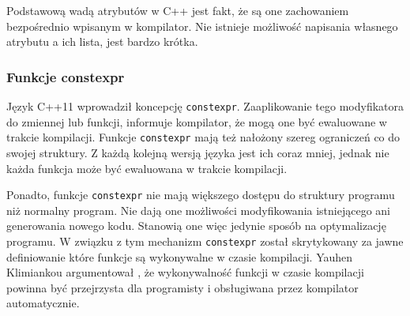 Podstawową wadą atrybutów w C++ jest fakt, że są one zachowaniem bezpośrednio wpisanym w kompilator. Nie istnieje możliwość napisania własnego atrybutu a ich lista, jest bardzo krótka.\par
\subsubsection{Funkcje constexpr}
Język C++11 wprowadził koncepcję \lstinline{constexpr}\cite{ISO:2012:III}.
Zaaplikowanie tego modyfikatora do zmiennej lub funkcji, informuje kompilator, że mogą one być ewaluowane w trakcie kompilacji. Funkcje \lstinline{constexpr} mają też nałożony szereg ograniczeń co do swojej struktury. Z każdą kolejną wersją języka jest ich coraz mniej, jednak nie każda funkcja może być ewaluowana w trakcie kompilacji.

Ponadto, funkcje \lstinline{constexpr} nie mają większego dostępu do struktury programu niż normalny program. Nie dają one możliwości modyfikowania istniejącego ani generowania nowego kodu. Stanowią one więc jedynie sposób na optymalizację programu.
W związku z tym mechanizm \lstinline{constexpr} został skrytykowany za jawne definiowanie które funkcje są wykonywalne w czasie kompilacji.
Yauhen Klimiankou argumentował \cite{Klimiankou:contexpr_great_good_wrong_idea}, że wykonywalność funkcji w czasie kompilacji powinna być przejrzysta dla programisty i obsługiwana przez kompilator automatycznie.
